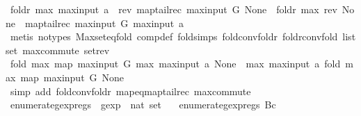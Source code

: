 \begin{isabellebody}
\ {\isachardoublequoteopen}foldr\ max\ {\isacharparenleft}max{\isacharunderscore}input\ a\ {\isacharhash}\ rev\ {\isacharparenleft}map{\isacharunderscore}tailrec\ max{\isacharunderscore}input\ G{\isacharparenright}{\isacharparenright}\ None\ {\isacharequal}\ foldr\ max\ {\isacharparenleft}rev\ {\isacharparenleft}None\ {\isacharhash}\ map{\isacharunderscore}tailrec\ max{\isacharunderscore}input\ G{\isacharparenright}{\isacharparenright}\ {\isacharparenleft}max{\isacharunderscore}input\ a{\isacharparenright}{\isachardoublequoteclose}\isanewline
\ \ \ \ \isamarkupfalse%
\ {\isacharparenleft}metis\ {\isacharparenleft}no{\isacharunderscore}types{\isacharparenright}\ Max{\isachardot}set{\isacharunderscore}eq{\isacharunderscore}fold\ comp{\isacharunderscore}def\ fold{\isachardot}simps{\isacharparenleft}{}{\isacharparenright}\ fold{\isacharunderscore}conv{\isacharunderscore}foldr\ foldr{\isacharunderscore}conv{\isacharunderscore}fold\ list{\isachardot}set{\isacharparenleft}{}{\isacharparenright}\ max{\isachardot}commute\ set{\isacharunderscore}rev{\isacharparenright}\isanewline
\ \ \isamarkupfalse%
\ \isamarkupfalse%
\ {\isachardoublequoteopen}fold\ max\ {\isacharparenleft}map\ max{\isacharunderscore}input\ G{\isacharparenright}\ {\isacharparenleft}max\ {\isacharparenleft}max{\isacharunderscore}input\ a{\isacharparenright}\ None{\isacharparenright}\ {\isacharequal}\ max\ {\isacharparenleft}max{\isacharunderscore}input\ a{\isacharparenright}\ {\isacharparenleft}fold\ max\ {\isacharparenleft}map\ max{\isacharunderscore}input\ G{\isacharparenright}\ None{\isacharparenright}{\isachardoublequoteclose}\isanewline
\ \ \ \ \isamarkupfalse%
\ {\isacharparenleft}simp\ add{\isacharcolon}\ fold{\isacharunderscore}conv{\isacharunderscore}foldr\ map{\isacharunderscore}eq{\isacharunderscore}map{\isacharunderscore}tailrec\ max{\isachardot}commute{\isacharparenright}\isanewline
{}\isamarkupfalse%
%
\endisatagproof
{\isafoldproof}%
%
\isadelimproof
\isanewline
%
\endisadelimproof
\isanewline
{}\isamarkupfalse%
\ enumerate{\isacharunderscore}gexp{\isacharunderscore}regs\ {\isacharcolon}{\isacharcolon}\ {\isachardoublequoteopen}gexp\ {\isasymRightarrow}\ nat\ set{\isachardoublequoteclose}\ \isanewline
\ \ {\isachardoublequoteopen}enumerate{\isacharunderscore}gexp{\isacharunderscore}regs\ {\isacharparenleft}Bc\ {\isacharunderscore}{\isacharparenright}\ {\isacharequal}\ {\isacharbraceleft}{\isacharbraceright}{\isachardoublequoteclose}\ {\isacharbar}\isanewline

\end{isabellebody}
